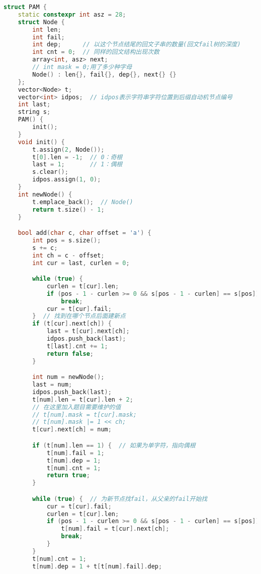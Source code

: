 \begin{lstlisting}[language=C++]
struct PAM {
    static constexpr int asz = 28;
    struct Node {
        int len;
        int fail;
        int dep;      // 以这个节点结尾的回文子串的数量(回文fail树的深度)
        int cnt = 0;  // 同样的回文结构出现次数
        array<int, asz> next;
        // int mask = 0;用了多少种字母
        Node() : len{}, fail{}, dep{}, next{} {}
    };
    vector<Node> t;
    vector<int> idpos;  // idpos表示字符串字符位置到后缀自动机节点编号
    int last;
    string s;
    PAM() {
        init();
    }
    void init() {
        t.assign(2, Node());
        t[0].len = -1;  // 0：奇根
        last = 1;       // 1：偶根
        s.clear();
        idpos.assign(1, 0);
    }
    int newNode() {
        t.emplace_back();  // Node()
        return t.size() - 1;
    }

    bool add(char c, char offset = 'a') {
        int pos = s.size();
        s += c;
        int ch = c - offset;
        int cur = last, curlen = 0;

        while (true) {
            curlen = t[cur].len;
            if (pos - 1 - curlen >= 0 && s[pos - 1 - curlen] == s[pos])
                break;
            cur = t[cur].fail;
        }  // 找到在哪个节点后面建新点
        if (t[cur].next[ch]) {
            last = t[cur].next[ch];
            idpos.push_back(last);
            t[last].cnt += 1;
            return false;
        }

        int num = newNode();
        last = num;
        idpos.push_back(last);
        t[num].len = t[cur].len + 2;
        // 在这里加入题目需要维护的值
        // t[num].mask = t[cur].mask;
        // t[num].mask |= 1 << ch;
        t[cur].next[ch] = num;

        if (t[num].len == 1) {  // 如果为单字符，指向偶根
            t[num].fail = 1;
            t[num].dep = 1;
            t[num].cnt = 1;
            return true;
        }

        while (true) {  // 为新节点找fail，从父亲的fail开始找
            cur = t[cur].fail;
            curlen = t[cur].len;
            if (pos - 1 - curlen >= 0 && s[pos - 1 - curlen] == s[pos]) {
                t[num].fail = t[cur].next[ch];
                break;
            }
        }
        t[num].cnt = 1;
        t[num].dep = 1 + t[t[num].fail].dep;


\end{lstlisting}
